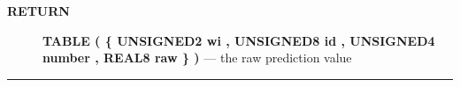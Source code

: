 \par
\begin{description}
\item [\colorbox{tagtype}{\color{white} \textbf{\textsf{RETURN}}}] \textbf{TABLE ( \{ UNSIGNED2 wi , UNSIGNED8 id , UNSIGNED4 number , REAL8 raw \} )} --- the raw prediction value
\end{description}




\rule{\linewidth}{0.5pt}
